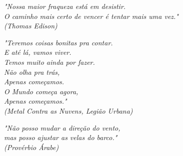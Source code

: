 \begin{epigrafe}
    \vspace*{\fill}
	\begin{flushright}
	  \textit{"Nossa maior fraqueza está em desistir. \\
	  O caminho mais certo de vencer é tentar mais uma vez." \\
				(Thomas Edison)		
	  }
	  
	  \textit{"Teremos coisas bonitas pra contar. \\
	  E até lá, vamos viver. \\
	  Temos muito ainda por fazer. \\
	  Não olha pra trás, \\
	  Apenas começamos. \\
	  O Mundo começa agora, \\
	  Apenas começamos." \\
	     (Metal Contra as Nuvens, Legião Urbana)
	  }
	  
	  \textit{"Não posso mudar a direção do vento, \\
	  mas posso ajustar as velas do barco." \\
	     (Provérbio Árabe)
	  }
	


 
 
  

	\end{flushright}
\end{epigrafe}
